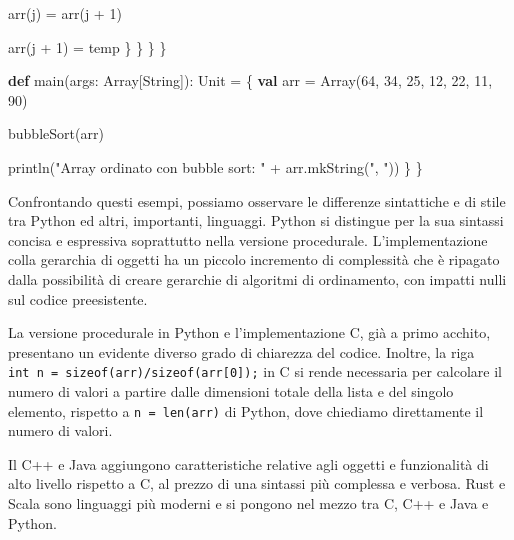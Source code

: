 \documentclass[
  letterpaper,
]{scrbook}
\newenvironment{Shaded}{\begin{snugshade}}{\end{snugshade}}
\newcommand{\BuiltInTok}[1]{\textcolor[rgb]{0.00,0.23,0.31}{#1}}
\newcommand{\DecValTok}[1]{\textcolor[rgb]{0.68,0.00,0.00}{#1}}
\newcommand{\ExtensionTok}[1]{\textcolor[rgb]{0.00,0.23,0.31}{#1}}
\newcommand{\FunctionTok}[1]{\textcolor[rgb]{0.28,0.35,0.67}{#1}}
\newcommand{\KeywordTok}[1]{\textcolor[rgb]{0.00,0.23,0.31}{\textbf{#1}}}
\newcommand{\NormalTok}[1]{\textcolor[rgb]{0.00,0.23,0.31}{#1}}
\newcommand{\OperatorTok}[1]{\textcolor[rgb]{0.37,0.37,0.37}{#1}}
\newcommand{\StringTok}[1]{\textcolor[rgb]{0.13,0.47,0.30}{#1}}
\begin{document}
\begin{itemize}
\begin{Shaded}
\begin{Highlighting}[]
          \FunctionTok{arr}\OperatorTok{(}\NormalTok{j}\OperatorTok{)} \OperatorTok{=} \FunctionTok{arr}\OperatorTok{(}\NormalTok{j }\OperatorTok{+} \DecValTok{1}\OperatorTok{)}

          \FunctionTok{arr}\OperatorTok{(}\NormalTok{j }\OperatorTok{+} \DecValTok{1}\OperatorTok{)} \OperatorTok{=}\NormalTok{ temp}
        \OperatorTok{\}}
      \OperatorTok{\}}
    \OperatorTok{\}}
  \OperatorTok{\}}

  \KeywordTok{def} \FunctionTok{main}\OperatorTok{(}\NormalTok{args}\OperatorTok{:} \ExtensionTok{Array}\OperatorTok{[}\ExtensionTok{String}\OperatorTok{]):} \BuiltInTok{Unit} \OperatorTok{=} \OperatorTok{\{}
    \KeywordTok{val}\NormalTok{ arr }\OperatorTok{=} \ExtensionTok{Array}\OperatorTok{(}\DecValTok{64}\OperatorTok{,} \DecValTok{34}\OperatorTok{,} \DecValTok{25}\OperatorTok{,} \DecValTok{12}\OperatorTok{,} \DecValTok{22}\OperatorTok{,} \DecValTok{11}\OperatorTok{,} \DecValTok{90}\OperatorTok{)}

    \FunctionTok{bubbleSort}\OperatorTok{(}\NormalTok{arr}\OperatorTok{)}

    \FunctionTok{println}\OperatorTok{(}\StringTok{"Array ordinato con bubble sort: "} \OperatorTok{+}\NormalTok{ arr}\OperatorTok{.}\FunctionTok{mkString}\OperatorTok{(}\StringTok{", "}\OperatorTok{))}
  \OperatorTok{\}}
\OperatorTok{\}}
\end{Highlighting}
\end{Shaded}
\end{itemize}

Confrontando questi esempi, possiamo osservare le differenze sintattiche
e di stile tra Python ed altri, importanti, linguaggi. Python si
distingue per la sua sintassi concisa e espressiva soprattutto nella
versione procedurale. L'implementazione colla gerarchia di oggetti ha un
piccolo incremento di complessità che è ripagato dalla possibilità di
creare gerarchie di algoritmi di ordinamento, con impatti nulli sul
codice preesistente.

La versione procedurale in Python e l'implementazione C, già a primo
acchito, presentano un evidente diverso grado di chiarezza del codice.
Inoltre, la riga \texttt{int\ n\ =\ sizeof(arr)/sizeof(arr{[}0{]});} in
C si rende necessaria per calcolare il numero di valori a partire dalle
dimensioni totale della lista e del singolo elemento, rispetto a
\texttt{n\ =\ len(arr)} di Python, dove chiediamo direttamente il numero
di valori.

Il C++ e Java aggiungono caratteristiche relative agli oggetti e
funzionalità di alto livello rispetto a C, al prezzo di una sintassi più
complessa e verbosa. Rust e Scala sono linguaggi più moderni e si
pongono nel mezzo tra C, C++ e Java e Python.
\end{document}

